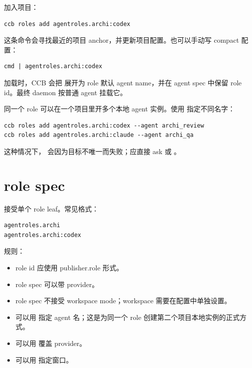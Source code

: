 加入项目：

\begin{lstlisting}
ccb roles add agentroles.archi:codex
\end{lstlisting}

这条命令会寻找最近的项目  anchor，并更新项目配置。也可以手动写 compact 配置：

\begin{lstlisting}
cmd | agentroles.archi:codex
\end{lstlisting}

加载时，CCB 会把  展开为 role 默认 agent name，并在 agent spec 中保留 role id。最终 daemon 按普通 agent 挂载它。

同一个 role 可以在一个项目里开多个本地 agent 实例。使用  指定不同名字：

\begin{lstlisting}
ccb roles add agentroles.archi:codex --agent archi_review
ccb roles add agentroles.archi:claude --agent archi_qa
\end{lstlisting}

这种情况下， 会因为目标不唯一而失败；应直接 ask  或 。

\section{role spec}

 接受单个 role leaf。常见格式：

\begin{lstlisting}
agentroles.archi
agentroles.archi:codex
\end{lstlisting}

规则：

\begin{itemize}
  \item role id 应使用 publisher.role 形式。
  \item role spec 可以带 provider。
  \item role spec 不接受 workspace mode；workspace 需要在配置中单独设置。
  \item 可以用  指定 agent 名；这是为同一个 role 创建第二个项目本地实例的正式方式。
  \item 可以用  覆盖 provider。
  \item 可以用  指定窗口。
\end{itemize}


